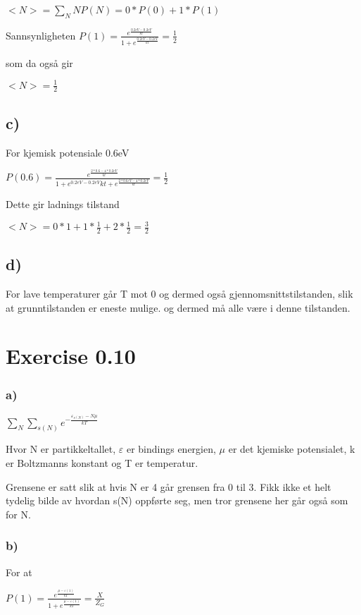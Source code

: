 \documentclass[12pt]{article}
\begin{document}
$<N> = \sum_N NP(N) = 0*P(0) + 1*P(1)$

Sannsynligheten 
$P(1) = \frac{e^{\frac{0.2eV - 0.2eV}{kt}}}{1+e^{\frac{0.2eV -0.2eV}{kt}}} = \frac{1}{2}$

som da også gir

$<N> = \frac{1}{2}$

\subsection*{c)}

For kjemisk potensiale 0.6eV

$P(0.6) = \frac{e^{\frac{2*0.6 - 4*0.2eV}{kt}}}{1 +e^{0.2eV -0.2eV}{kt} + e^{\frac{2*0.6eV - 4*0.2eV}{kt}}} = \frac{1}{2}$

Dette gir ladnings tilstand

$<N> = 0*1 +1*\frac{1}{2} + 2*\frac{1}{2} = \frac{3}{2}$

\subsection*{d)}

For lave temperaturer går T mot 0 og dermed også gjennomsnittstilstanden, slik at grunntilstanden er eneste mulige. og dermed må alle være i denne tilstanden. 

\section*{Exercise 0.10}

\subsubsection*{a)}

$\sum_N \sum_{s(N)}e^{-\frac{\varepsilon_{s(N)}- N\mu}{kT}}$

Hvor N er partikkeltallet, $\varepsilon$ er bindings energien, $\mu$ er det kjemiske potensialet, k er Boltzmanns konstant og T er temperatur.

Grensene er satt slik at hvis N er 4 går grensen fra 0 til 3.  Fikk ikke et helt tydelig bilde av hvordan s(N) oppførte seg, men tror grensene her går også som for N.

\subsubsection*{b)}

For at

$ P(1) = \frac{e^{\frac{\mu - \varepsilon(1)}{kT}}}{1 + e^{\frac{\mu - \varepsilon(1)}{kT}}} = \frac{X}{Z_G}$
\end{document}
